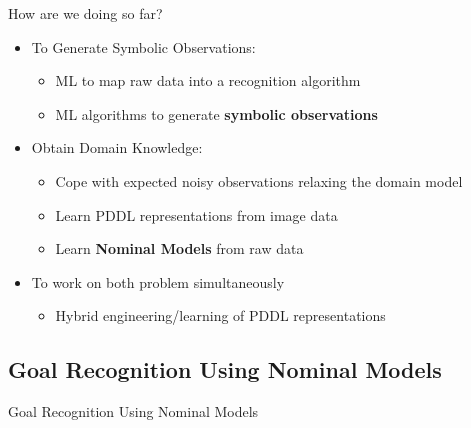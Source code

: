 \documentclass[usenames,dvipsnames]{beamer}
\begin{document}
\begin{frame}[c]{How are we doing so far?}
	\begin{itemize}
		\item To Generate Symbolic Observations:
		\begin{itemize}
			\item ML to map raw data into a recognition algorithm {\Large \checkmark}
			\item ML algorithms to generate \textbf{symbolic observations} 
		\end{itemize}
		\item Obtain Domain Knowledge:
		\begin{itemize}
			\item Cope with expected noisy observations relaxing the domain model {\Large \checkmark}
			\item Learn PDDL representations from image data {\Large \color{red} \checkmark}
			\item Learn \textbf{Nominal Models} from raw data
		\end{itemize}
		\item To work on both problem simultaneously
		\begin{itemize}
			\item Hybrid engineering/learning of PDDL representations 
		\end{itemize}
	\end{itemize}
\end{frame}

\subsection{Goal Recognition Using Nominal Models}

\begin{frame}[c]
	\begin{center}
		\Large{Goal Recognition Using Nominal Models}
	\end{center}
\end{frame}
\end{document}
